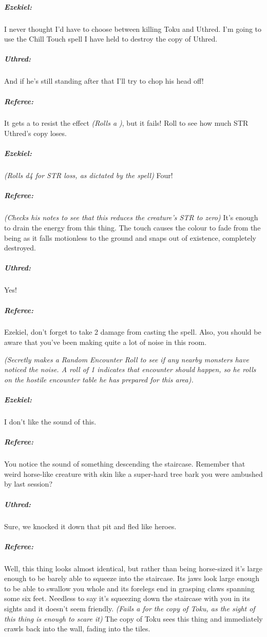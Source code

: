 \documentclass[itdr]{subfiles}
\begin{document}
\subparagraph{Ezekiel:} I never thought I'd have to choose between killing Toku and Uthred. I'm going to use the Chill Touch spell I have held to destroy the copy of Uthred.

\subparagraph{Uthred:} And if he's still standing after that I'll try to chop his head off!

\subparagraph{Referee:} It gets a  to resist the effect {\em (Rolls a )}, but it fails! Roll to see how much STR Uthred's copy loses.

\subparagraph{Ezekiel:} {\em (Rolls d4 for STR loss, as dictated by the
spell)} Four!

\subparagraph{Referee:} {\em (Checks his notes to see that this reduces the creature's STR to zero)} It's enough to drain the energy from this thing. The touch causes the colour to fade from the being as it falls motionless to the ground and snaps out of existence, completely destroyed.

\subparagraph{Uthred:} Yes!

\subparagraph{Referee:} Ezekiel, don't forget to take 2 damage from casting the spell. Also, you should be aware that you've been making quite a lot of noise in this room.

{\em (Secretly makes a Random Encounter Roll to see if any nearby monsters have noticed the noise. A roll of 1 indicates that encounter should happen, so he rolls on the hostile encounter table he has prepared for this area).}

\subparagraph{Ezekiel:} I don't like the sound of this.

\subparagraph{Referee:} You notice the sound of something descending the staircase. Remember that weird horse-like creature with skin like a super-hard tree bark you were ambushed by last session?

\subparagraph{Uthred:} Sure, we knocked it down that pit and fled like heroes.

\subparagraph{Referee:} Well, this thing looks almost identical, but rather than being horse-sized it's large enough to be barely able to squeeze into the staircase. Its jaws look large enough to be able to swallow you whole and its forelegs end in grasping claws spanning some six feet. Needless to say it's squeezing down the staircase with you in its sights and it doesn't seem friendly. {\em (Fails a  for the copy of Toku, as the sight of this thing is enough to scare it)} The copy of Toku sees this thing and immediately crawls back into the wall, fading into the tiles.
\end{document}
